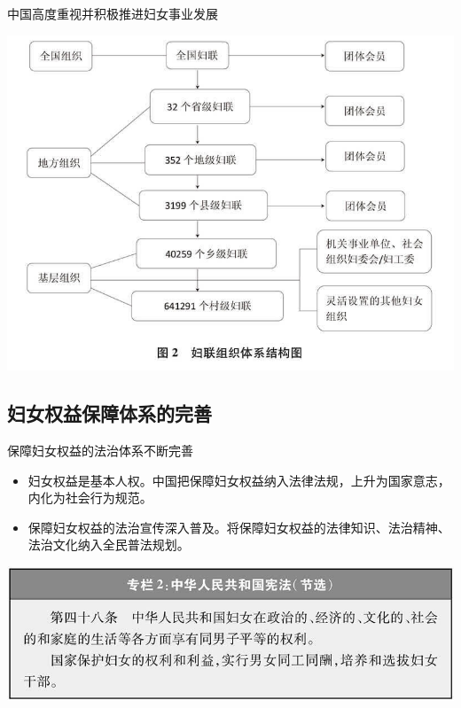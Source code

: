 \begin{frame}{中国高度重视并积极推进妇女事业发展}
    \begin{center}
        \includegraphics[width=.7\textwidth]{../docs/img/2-2.jpg}
    \end{center}
\end{frame}



\subsection{妇女权益保障体系的完善}
\begin{frame}{保障妇女权益的法治体系不断完善}
    \begin{block}{}
        \begin{itemize}
            \item 妇女权益是基本人权。中国把保障妇女权益纳入法律法规，上升为国家意志，内化为社会行为规范。
            \item 保障妇女权益的法治宣传深入普及。将保障妇女权益的法律知识、法治精神、法治文化纳入全民普法规划。
        \end{itemize}
    \end{block}
    \begin{center}
        \includegraphics[width=\textwidth]{../docs/img/2-3.jpg}
    \end{center}
\end{frame}




